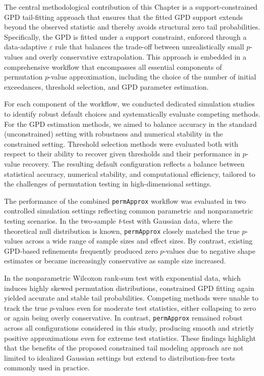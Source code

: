 The central methodological contribution of this Chapter is a support-constrained GPD tail-fitting approach that ensures that the fitted GPD support extends beyond the observed statistic and thereby avoids structural zero tail probabilities. Specifically, the GPD is fitted under a support constraint, enforced through a data-adaptive $\varepsilon$ rule that balances the trade-off between unrealistically small $p$-values and overly conservative extrapolation. This approach is embedded in a comprehensive workflow that encompasses all essential components of permutation $p$-value approximation, including the choice of the number of initial exceedances, threshold selection, and GPD parameter estimation.

For each component of the workflow, we conducted dedicated simulation studies to identify robust default choices and systematically evaluate competing methods. For the GPD estimation methods, we aimed to balance accuracy in the standard (unconstrained) setting with robustness and numerical stability in the constrained setting. Threshold selection methods were evaluated both with respect to their ability to recover given thresholds and their performance in $p$-value recovery. The resulting default configuration reflects a balance between statistical accuracy, numerical stability, and computational efficiency, tailored to the challenges of permutation testing in high-dimensional settings.

The performance of the combined \texttt{permApprox} workflow was evaluated in two controlled simulation settings reflecting common parametric and nonparametric testing scenarios. In the two-sample \textit{t}-test with Gaussian data, where the theoretical null distribution is known, \texttt{permApprox} closely matched the true $p$-values across a wide range of sample sizes and effect sizes. By contrast, existing GPD-based refinements frequently produced zero $p$-values due to negative shape estimates or became increasingly conservative as sample size increased.

In the nonparametric Wilcoxon rank-sum test with exponential data, which induces highly skewed permutation distributions, constrained GPD fitting again yielded accurate and stable tail probabilities. Competing methods were unable to track the true $p$-values even for moderate test statistics, either collapsing to zero or again being overly conservative. In contrast, \texttt{permApprox} remained robust across all configurations considered in this study, producing smooth and strictly positive approximations even for extreme test statistics. These findings highlight that the benefits of the proposed constrained tail modeling approach are not limited to idealized Gaussian settings but extend to distribution-free tests commonly used in practice.

